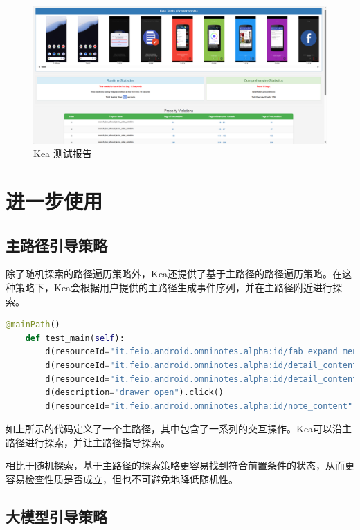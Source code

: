 \documentclass{article}
\begin{document}
\begin{figure}[H]
\centering
\includegraphics[width=\textwidth]{img/1.png}
\caption{Kea 测试报告}
\label{fig:1}
\end{figure}

\section{进一步使用}

\subsection{主路径引导策略}

除了随机探索的路径遍历策略外，Kea还提供了基于主路径的路径遍历策略。在这种策略下，Kea会根据用户提供的主路径生成事件序列，并在主路径附近进行探索。

\begin{lstlisting}[language=python]
    @mainPath()
    def test_main(self):
        d(resourceId="it.feio.android.omninotes.alpha:id/fab_expand_menu_button").long_click()
        d(resourceId="it.feio.android.omninotes.alpha:id/detail_content").click()
        d(resourceId="it.feio.android.omninotes.alpha:id/detail_content").set_text("read a book #Tag1")
        d(description="drawer open").click()
        d(resourceId="it.feio.android.omninotes.alpha:id/note_content").click()
\end{lstlisting}

如上所示的代码定义了一个主路径，其中包含了一系列的交互操作。Kea可以沿主路径进行探索，并让主路径指导探索。

相比于随机探索，基于主路径的探索策略更容易找到符合前置条件的状态，从而更容易检查性质是否成立，但也不可避免地降低随机性。

\subsection{大模型引导策略}
\end{document}
